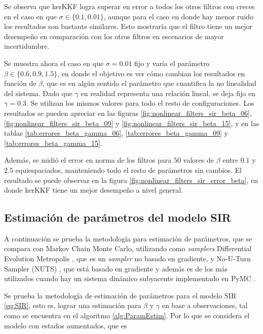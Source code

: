 Se observa que kerKKF logra superar en error a todos los otros filtros con creces en el caso en que $\sigma \in \{ 0.1, 0.01\}$, aunque para el caso en donde hay menor ruido los resultados son bastante similares. Esto mostraría que el filtro tiene un mejor desempeño en comparación con los otros filtros en escenarios de mayor incertidumbre.

Se muestra ahora el caso en que $\sigma = 0.01$ fijo y varía el parámetro $\beta \in \{0.6, 0.9, 1.5\}$, en donde el objetivo es ver cómo cambian los resultados en función de $\beta$, que es en algún sentido el parámetro que cuantifica la no linealidad del sistema. Dado que $\gamma$ en realidad representa una relación lineal, se deja fijo en $\gamma = 0.3$. Se utilizan los mismos valores para todo el resto de configuraciones. Los resultados se pueden apreciar en las figuras \ref{fig:nonlinear_filters_sir_beta_06}, \ref{fig:nonlinear_filters_sir_beta_09} y \ref{fig:nonlinear_filters_sir_beta_15}, y en las tablas \ref{tab:errores_beta_gamma_06}, \ref{tab:errores_beta_gamma_09} y \ref{tab:errores_beta_gamma_15}.

Además, se midió el error en norma de los filtros para $50$ valores de $\beta$ entre $0.1$ y $2.5$ equiespaciados, manteniendo todo el resto de parámetros sin cambios. El resultado se puede observar en la figura \ref{fig:nonlinear_filters_sir_error_beta}, en donde kerKKF tiene un mejor desempeño a nivel general.





\subsection{Estimación de parámetros del modelo SIR}

A continuación se prueba la metodología para estimación de parámetros, que se compara con Markov Chain Monte Carlo, utilizando como \textit{samplers} Differential Evolution Metropolis \cite{terBraak2008DifferentialChains}, que es un \textit{sampler} no basado en gradiente, y No-U-Turn Sampler (NUTS) \cite{Hoffman2014TheCarlo}, que está basado en gradiente y además es de los más utilizados cuando hay un sistema dinámico subyacente implementado en PyMC \cite{Patil2010PyMC:Python}.

Se prueba la metodología de estimación de parámetros para el modelo SIR \eqref{eq:SIR}, esto es, lograr una estimación para $\beta$ y $\gamma$ en base a observaciones, tal como se encuentra en el algoritmo \ref{alg:ParamEstim}. Por lo que se considera el modelo con estados aumentados, que es

